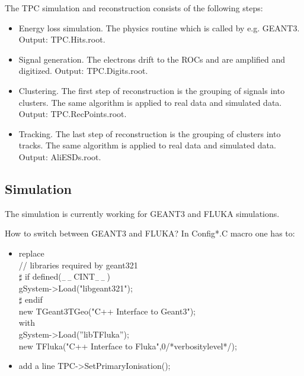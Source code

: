 \documentclass[a4paper,12pt]{article}
\begin{document}
The TPC simulation and reconstruction consists of the following steps:
\begin{itemize}
\item Energy loss simulation. The physics routine which is called by
e.g. GEANT3. Output: TPC.Hits.root.
\item Signal generation. The electrons drift to the ROCs and are
amplified and digitized. Output: TPC.Digits.root.
\item Clustering. The first step of reconstruction is the grouping of
signals into clusters. The same algorithm is applied to real data and
simulated data. Output: TPC.RecPoints.root.
\item Tracking. The last step of reconstruction is the grouping of
clusters into tracks. The same algorithm is applied to real data and
simulated data. Output: AliESDs.root.
\end{itemize}

\subsection{Simulation}

The simulation is currently working for GEANT3 and FLUKA simulations. 

How to switch between GEANT3 and FLUKA? In Config*.C macro one has to:
\begin{itemize}
\item replace    \\
// libraries required by geant321\\
$\sharp$ if defined($_{--}$CINT$_{--}$)\\
      gSystem->Load("libgeant321");\\
$\sharp$ endif\\

      new     TGeant3TGeo("C++ Interface to Geant3");\\

 with \\
     gSystem->Load(''libTFluka'');\\
     new TFluka("C++ Interface to Fluka",0/*verbositylevel*/);\\
     
\item add a line TPC->SetPrimaryIonisation();  
\end{itemize}
\end{document}
